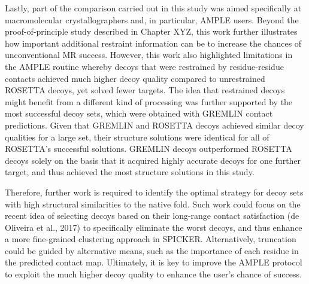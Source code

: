 Lastly, part of the comparison carried out in this study was aimed specifically at macromolecular crystallographers and, in particular, AMPLE users. Beyond the proof-of-principle study described in Chapter XYZ, this work further illustrates how important additional restraint information can be to increase the chances of unconventional MR success. However, this work also highlighted limitations in the AMPLE routine whereby decoys that were restrained by residue-residue contacts achieved much higher decoy quality compared to unrestrained ROSETTA decoys, yet solved fewer targets. The idea that restrained decoys might benefit from a different kind of processing was further supported by the most successful decoy sets, which were obtained with GREMLIN contact predictions. Given that GREMLIN and ROSETTA decoys achieved similar decoy qualities for a large set, their structure solutions were identical for all of ROSETTA’s successful solutions. GREMLIN decoys outperformed ROSETTA decoys solely on the basis that it acquired highly accurate decoys for one further target, and thus achieved the most structure solutions in this study. 

Therefore, further work is required to identify the optimal strategy for decoy sets with high structural similarities to the native fold. Such work could focus on the recent idea of selecting decoys based on their long-range contact satisfaction (de Oliveira et al., 2017) to specifically eliminate the worst decoys, and thus enhance a more fine-grained clustering approach in SPICKER. Alternatively, truncation could be guided by alternative means, such as the importance of each residue in the predicted contact map. Ultimately, it is key to improve the AMPLE protocol to exploit the much higher decoy quality to enhance the user’s chance of success.
